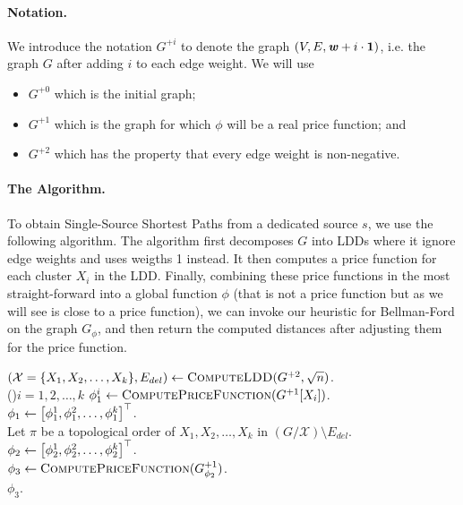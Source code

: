 \paragraph{Notation.} We introduce the notation $G^{+i}$ to denote the graph $(V, E, \boldsymbol{\mathit{w}} + i \cdot \boldsymbol{1})$, i.e. the graph $G$ after adding $i$ to each edge weight. We will use 
\begin{itemize}
    \item $G^{+0}$ which is the initial graph;
    \item $G^{+1}$ which is the graph for which $\phi$ will be a real price function; and
    \item $G^{+2}$ which has the property that every edge weight is non-negative.
\end{itemize}  

\paragraph{The Algorithm.} To obtain Single-Source Shortest Paths from a dedicated source $s$, we use the following algorithm. The algorithm first decomposes $G$ into LDDs where it ignore edge weights and uses weigths 1 instead. It then computes a price function for each cluster $X_i$ in the LDD. Finally, combining these price functions in the most straight-forward into a global function $\phi$ (that is not a price function but as we will see is close to a price function), we can invoke our heuristic for Bellman-Ford on the graph $G_{\phi}$, and then return the computed distances after adjusting them for the price function.

\begin{algorithm}
$(\mathcal{X} = \{X_1, X_2, \ldots, X_k\}, E_{del}) \gets \textsc{ComputeLDD}(G^{+2}, \sqrt{n})$.\\

\lFor(\label{lne:priceFunInvocClusters}){$i = 1, 2, \ldots, k$}{
	$\phi_1^i \gets \textsc{ComputePriceFunction}(G^{+1}[X_i])$.
}
$\phi_1 \gets \left[ \phi_1^1 , \phi_1^2 , \ldots,  \phi_1^k \right]^{\top}$.\\

Let $\pi$ be a topological order of $X_1, X_2, \ldots, X_k$ in $(G/ \mathcal{X}) \setminus E_{del}$.\\
$\phi_2 \gets \left[ \phi_2^1 , \phi_2^2 , \ldots,  \phi_2^k \right]^{\top}$.\\
$\phi_3 \gets  \textsc{ComputePriceFunction}(G^{+1}_{\phi_2})$.\label{lne:computePriceOnNegBackEdges}\\
\Return $\phi_3$.
\caption{$\textsc{PriceFunctionOnNormalizedGraph}(G = (V, E,\ww))$}
\label{alg:negSSSPEasy}
\end{algorithm}

